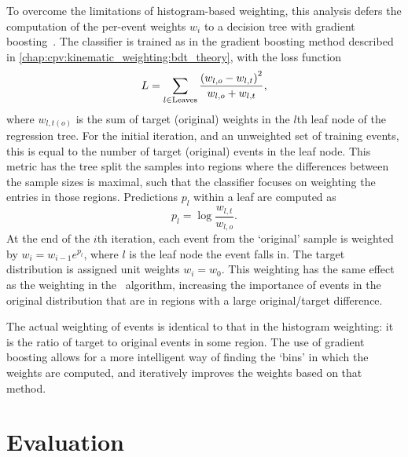 To overcome the limitations of histogram-based weighting, this analysis defers 
the computation of the per-event weights $w_{i}$ to a decision tree with 
gradient boosting~\cite{Rogozhnikov:2016bdp}.
The classifier is trained as in the gradient boosting method described in 
\cref{chap:cpv:kinematic_weighting:bdt_theory}, with the loss function
\begin{equation}
  L = \sum_{l \in \text{Leaves}} \frac{%
    {(w_{l,o} - w_{l,t})}^{2}
  }{%
    w_{l,o} + w_{l,t}
  },
\end{equation}
where $w_{l,t(o)}$ is the sum of target (original) weights in the $l$th leaf 
node of the regression tree.
For the initial iteration, and an unweighted set of training events, this is 
equal to the number of target (original) events in the leaf node.
This metric has the tree split the samples into regions where the differences 
between the sample sizes is maximal, such that the classifier focuses on 
weighting the entries in those regions.
Predictions $p_{l}$ within a leaf are computed as
\begin{equation}
  p_{l} = \log{\frac{w_{l,t}}{w_{l,o}}}.
\end{equation}
At the end of the $i$th iteration, each event from the `original' sample is 
weighted by $w_{i} = w_{i - 1}e^{p_{l}}$, where $l$ is the leaf node the event 
falls in.
The target distribution is assigned unit weights $w_{i} = w_{0}$.
This weighting has the same effect as the weighting in the \adaboost\ 
algorithm, increasing the importance of events in the original distribution 
that are in regions with a large original/target difference.

The actual weighting of events is identical to that in the histogram weighting: 
it is the ratio of target to original events in some region.
The use of gradient boosting allows for a more intelligent way of finding the 
`bins' in which the weights are computed, and iteratively improves the weights 
based on that method.

\section{Evaluation}
\label{chap:cpv:kinematic_weighting:evaluation}


